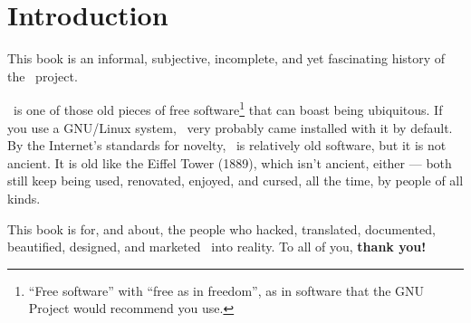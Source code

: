 
\chapter{Introduction}

This book is an informal, subjective, incomplete, and yet fascinating
history of the \GNOME\ project.

\GNOME\ is one of those old pieces of free software\footnote{``Free
  software'' with ``free as in freedom'', as in software that the GNU
  Project would recommend you use.} that can boast being ubiquitous.
If you use a GNU/Linux system, \GNOME\ very probably came installed
with it by default.  By the Internet's standards for novelty,
\GNOME\ is relatively old software, but it is not ancient.  It is old
like the Eiffel Tower (1889), which isn't ancient, either --- both
still keep being used, renovated, enjoyed, and cursed, all the time,
by people of all kinds.

This book is for, and about, the people who hacked, translated,
documented, beautified, designed, and marketed \GNOME\ into reality.
To all of you, {\bf thank you!}
